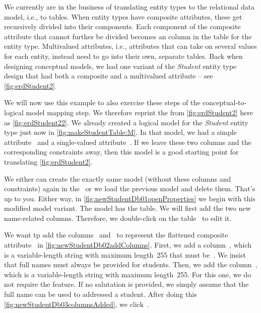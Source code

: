 %
%
%
%
We currently are in the business of translating entity types to the relational data model, i.e., to tables.
When entity types have composite attributes, these get recursively divided into their components.
Each component of the composite attribute that cannot further be divided becomes an column in the table for the entity type.
Multivalued attributes, i.e., attributes that can take on several values for each entity, instead need to go into their own, separate tables.
Back when designing conceptual models, we had one variant of the \emph{Student} entity type design that had both a composite and a multivalued attribute -- see \cref{fig:erdStudent2}.

We will now use this example to also exercise these steps of the conceptual-to-logical model mapping step.
We therefore reprint the  from \cref{fig:erdStudent2} here as \cref{fig:erdStudent22}.
We already created a logical model for the \emph{Student} entity type just now in \cref{fig:makeStudentTable:M}.
In that model, we had a simple attribute~ and a single-valued attribute~.
If we leave these two columns and the corresponding constraints away, then this model is a good starting point for translating \cref{fig:erdStudent2}.

We either can create the exactly same model (without these columns and constraints) again in the \pgmodeler\ or we load the previous model and delete them.
That's up to you.
Either way, in \cref{fig:newStudentDb01openProperties} we begin with this modified model variant.
The model has the  table.
We will first add the two new name-related columns.
Therefore, we double-click on the table~ to edit it.

We want tp add the columns~ and~ to represent the flattened composite attribute~ in \cref{fig:newStudentDb02addColumns}.
First, we add a column~, which is a variable-length string with maximum length~255 that must be~.
We insist that full names must always be provided for students.
Then, we add the column~, which is a variable-length string with maximum length~255.
For this one, we do not require the  feature.
If no salutation is provided, we simply assume that the full name can be used to addressed a student.
After doing this \cref{fig:newStudentDb03columnsAdded}, we click~.

